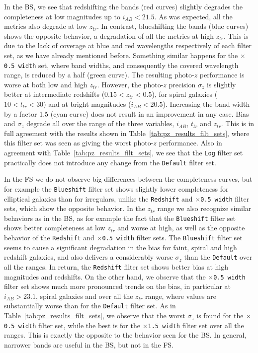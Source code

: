 In the BS, we see that redshifting the bands (red curves) slightly degrades the completeness at low magnitudes up to $i_{AB}<21.5$. As was expected, all the metrics also degrade at low $z_{tr}$. In contrast, blueshifting the bands (blue curves) shows the opposite behavior, a degradation of all the metrics at high $z_{tr}$. This is due to the lack of coverage at blue and red wavelengths respectively of each filter set, as we have already mentioned before. Something similar happens for the \texttt{$\times$0.5 width} set, where band widths, and consequently the covered wavelength range, is reduced by a half (green curve). The resulting photo-$z$ performance is worse at both low and high $z_{tr}$. However, the photo-$z$ precision $\sigma_z$ is slightly better at intermediate redshifts ($0.15<z_{tr}<0.5$), for spiral galaxies ($10<t_{tr}<30$) and at bright magnitudes ($i_{AB}<20.5$). Increasing the band width by a factor 1.5 (cyan curve) does not result in an improvement in any case. Bias and $\sigma_z$ degrade all over the range of the three variables, $i_{AB}$, $t_{tr}$ and $z_{tr}$. This is in full agreement with the results shown in Table~\ref{tab:pz_results_filt_sets}, where this filter set was seen as giving the worst photo-$z$ performance. Also in agreement with Table~\ref{tab:pz_results_filt_sets}, we see that the \texttt{Log} filter set practically does not introduce any change from the \texttt{Default} filter set. 

In the FS we do not observe big differences between the completeness curves, but for example the \texttt{Blueshift} filter set shows slightly lower completeness for elliptical galaxies than for irregulars, unlike the \texttt{Redshift} and \texttt{$\times$0.5 width} filter sets, which show the opposite behavior. In the $z_{tr}$ range we also recognize similar behaviors as in the BS, as for example the fact that the \texttt{Blueshift} filter set shows better completeness at low $z_{tr}$ and worse at high, as well as the opposite behavior of the \texttt{Redshift} and \texttt{$\times$0.5 width} filter sets. The \texttt{Blueshift} filter set seems to cause a significant degradation in the bias for faint, spiral and high redshift galaxies, and also delivers a considerably worse $\sigma_z$ than the \texttt{Default} over all the ranges. In return, the \texttt{Redshift} filter set shows better bias at high magnitudes and redshifts. On the other hand, we observe that the \texttt{$\times$0.5 width} filter set shows much more pronounced trends on the bias, in particular at $i_{AB}>23.1$, spiral galaxies and over all the $z_{tr}$ range, where values are substantially worse than for the \texttt{Default} filter set. As in Table~\ref{tab:pz_results_filt_sets}, we observe that the worst $\sigma_z$ is found for the \texttt{$\times$0.5 width} filter set, while the best is for the \texttt{$\times$1.5 width} filter set over all the ranges. This is exactly the opposite to the behavior seen for the BS. 
In general, narrower bands are useful in the BS, but not in the FS.  
